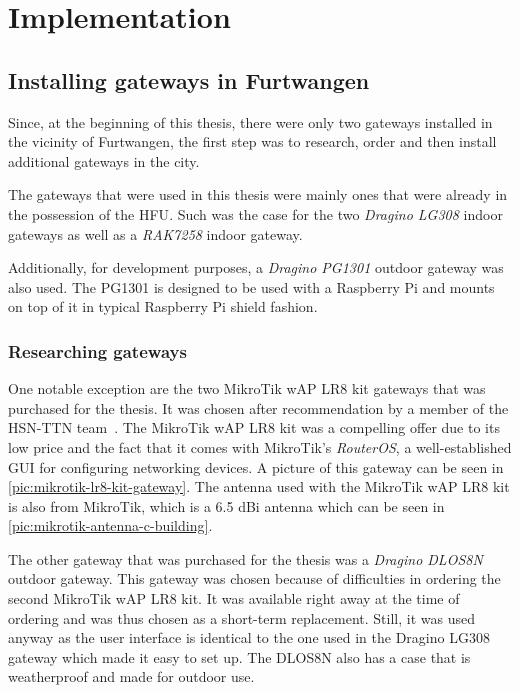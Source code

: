 \chapter{Implementation}

\section{Installing gateways in Furtwangen}

Since, at the beginning of this thesis, there were only two gateways installed in the vicinity of Furtwangen, the first step was to research, order and then install additional gateways in the city.

The gateways that were used in this thesis were mainly ones that were already in the possession of the \ac{HFU}.
Such was the case for the two \emph{Dragino LG308} indoor gateways as well as a \emph{RAK7258} indoor gateway.

Additionally, for development purposes, a \emph{Dragino PG1301} outdoor gateway was also used.
The PG1301 is designed to be used with a Raspberry Pi and mounts on top of it in typical Raspberry Pi shield fashion.

\subsection{Researching gateways}

One notable exception are the two MikroTik wAP LR8 kit gateways that was purchased for the thesis.
It was chosen after recommendation by a member of the \ac{HSN-TTN} team~\cite{noauthor_eingesetzte_nodate}.
The MikroTik wAP LR8 kit was a compelling offer due to its low price and the fact that it comes with MikroTik's \emph{RouterOS}, a well-established GUI for configuring networking devices.
A picture of this gateway can be seen in \cref{pic:mikrotik-lr8-kit-gateway}.
The antenna used with the MikroTik wAP LR8 kit is also from MikroTik, which is a 6.5 dBi antenna which can be seen in \cref{pic:mikrotik-antenna-c-building}.

The other gateway that was purchased for the thesis was a \emph{Dragino DLOS8N} outdoor gateway.
This gateway was chosen because of difficulties in ordering the second MikroTik wAP LR8 kit.
It was available right away at the time of ordering and was thus chosen as a short-term replacement.
Still, it was used anyway as the user interface is identical to the one used in the Dragino LG308 gateway which made it easy to set up.
The DLOS8N also has a case that is weatherproof and made for outdoor use. 

